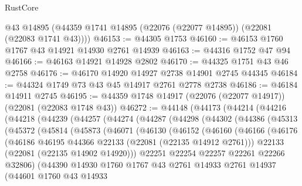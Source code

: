 \begin{lexlean}{RustCore}
\begin{coremodule}
      @43
      @14895
      (@44359 @1741 @14895 (@22076 (@22077 @14895)) (@22081 (@22083 @1741 @43))))
@46153 := @44305 @1753
@46160 := @46153 @1760 @1767 @43 @14921 @14930 @2761 @14939
@46163 := @44316 @1752 @47 @94
@46166 := @46163 @14921 @14928 @2802
@46170 := @44325 @1751 @43 @46 @2758
@46176 := @46170 @14920 @14927 @2738 @14901 @2745 @44345
@46184 := @44324 @1749 @73 @43 @45 @14917 @2761 @2778 @2738
@46186 := @46184 @14911 @2745
@46195 := @44359 @1748 @14917 (@22076 (@22077 @14917)) (@22081 (@22083 @1748 @43))
@46272 := @44148
    (@44173
      (@44214
        (@44216
          (@44218
            (@44239
              (@44257
                (@44274
                  (@44287
                    (@44298
                      (@44302
                        (@44386
                          (@45313
                            (@45372
                              (@45814
                                (@45873
                                  (@46071
                                    (@46130
                                      (@46152
                                        (@46160
                                          (@46166
                                            (@46176
                                              (@46186
                                                @46195
                                                @44366
                                                @22133
                                                (@22081 (@22135 @14912 @2761)))
                                              @22133
                                              (@22081 (@22135 @14902 @14920)))
                                            @22251
                                            @22254
                                            @22257
                                            @22261
                                            @22266
                                            @32806)
                                          (@44390
                                            @14930
                                            @1760
                                            @1767
                                            @43
                                            @2761
                                            @14933
                                            @2761
                                            @14937
                                            (@44601
                                              @1760
                                              @43
                                              @14933

\end{coremodule}
\end{lexlean}
